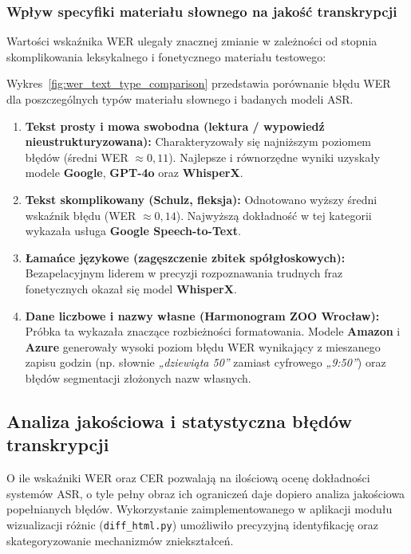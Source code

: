 

\subsubsection{Wpływ specyfiki materiału słownego na jakość transkrypcji}
\label{subsubsec:text_type_impact}

Wartości wskaźnika WER ulegały znacznej zmianie w zależności od stopnia skomplikowania leksykalnego i fonetycznego materiału testowego:

Wykres~\ref{fig:wer_text_type_comparison} przedstawia porównanie błędu WER dla poszczególnych typów materiału słownego i badanych modeli ASR.



\begin{enumerate}
    \item \textbf{Tekst prosty i mowa swobodna (lektura / wypowiedź nieustrukturyzowana):} Charakteryzowały się najniższym poziomem błędów (średni WER $\approx 0{,}11$). Najlepsze i równorzędne wyniki uzyskały modele \textbf{Google}, \textbf{GPT-4o} oraz \textbf{WhisperX}.
    \item \textbf{Tekst skomplikowany (Schulz, fleksja):} Odnotowano wyższy średni wskaźnik błędu (WER $\approx 0{,}14$). Najwyższą dokładność w tej kategorii wykazała usługa \textbf{Google Speech-to-Text}.
    \item \textbf{Łamańce językowe (zagęszczenie zbitek spółgłoskowych):} Bezapelacyjnym liderem w precyzji rozpoznawania trudnych fraz fonetycznych okazał się model \textbf{WhisperX}.
    \item \textbf{Dane liczbowe i nazwy własne (Harmonogram ZOO Wrocław):} Próbka ta wykazała znaczące rozbieżności formatowania. Modele \textbf{Amazon} i \textbf{Azure} generowały wysoki poziom błędu WER wynikający z mieszanego zapisu godzin (np. słownie \textit{„dziewiąta 50”} zamiast cyfrowego \textit{„9:50”}) oraz błędów segmentacji złożonych nazw własnych.
\end{enumerate}

\subsection{Analiza jakościowa i statystyczna błędów transkrypcji}
\label{subsec:error_analysis}

O ile wskaźniki WER oraz CER pozwalają na ilościową ocenę dokładności systemów ASR, o tyle pełny obraz ich ograniczeń daje dopiero analiza jakościowa popełnianych błędów. Wykorzystanie zaimplementowanego w aplikacji modułu wizualizacji różnic (\texttt{diff\_html.py}) umożliwiło precyzyjną identyfikację oraz skategoryzowanie mechanizmów zniekształceń.

